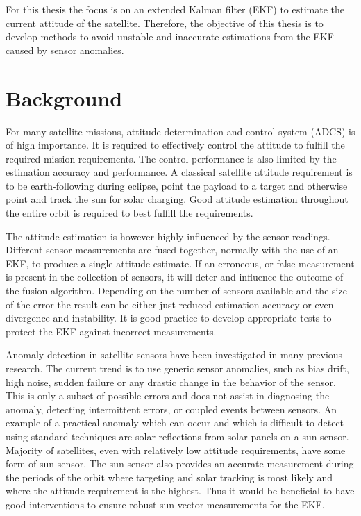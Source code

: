 For this thesis the focus is on an extended Kalman filter (EKF) to estimate the current attitude of the satellite. Therefore, the objective of this thesis is to develop methods to avoid unstable and inaccurate estimations from the EKF caused by sensor anomalies.

\section{Background}
For many satellite missions, attitude determination and control system (ADCS) is of high importance. It is required to effectively control the attitude to fulfill the required mission requirements.  The control performance is also limited by the estimation accuracy and performance.  A classical satellite attitude requirement is to be earth-following during eclipse, point the payload to a target and otherwise point and track the sun for solar charging. Good attitude estimation throughout the entire orbit is required to best fulfill the requirements.

The attitude estimation is however highly influenced by the sensor readings. Different sensor measurements are fused together, normally with the use of an EKF, to produce a single attitude estimate.  If an erroneous, or false measurement is present in the collection of sensors, it will deter and influence the outcome of the fusion algorithm.  Depending on the number of sensors available and the size of the error the result can be either just reduced estimation accuracy or even divergence and instability. It is good practice to develop appropriate tests to protect the EKF against incorrect measurements. 

Anomaly detection in satellite sensors have been investigated in many previous research.  The current trend is to use generic sensor anomalies, such as bias drift, high noise, sudden failure or any drastic change in the behavior of the sensor. This is only a subset of possible errors and does not assist in diagnosing the anomaly, detecting intermittent errors, or coupled events between sensors. An example of a practical anomaly which can occur and which is difficult to detect using standard techniques are solar reflections from solar panels on a sun sensor. Majority of satellites, even with relatively low attitude requirements, have some form of sun sensor.  The sun sensor also provides an accurate measurement during the periods of the orbit where targeting and solar tracking is most likely and where the attitude requirement is the highest.  Thus it would be beneficial to have good interventions to ensure robust sun vector measurements for the EKF.

